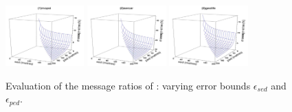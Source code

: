 {\begin{figure}[tb!]
	\centering
	\includegraphics[width= 0.27\textwidth]{figures/Fig-BITT-mopsi-total-messages.png}\hspace{4ex}
	\includegraphics[width= 0.27\textwidth]{figures/Fig-BITT-sercar-total-messages.png}\hspace{4ex}
	\includegraphics[width= 0.27\textwidth]{figures/Fig-BITT-geolife-total-messages.png}\hspace{0ex}
	\vspace{-1ex}
	\caption{\small Evaluation of the message ratios of \bitt: varying error bounds $\epsilon_{sed}$ and $\epsilon_{ped}$.}
	\label{fig:bitt-total-message}
	\vspace{-1ex}
\end{figure}




}
